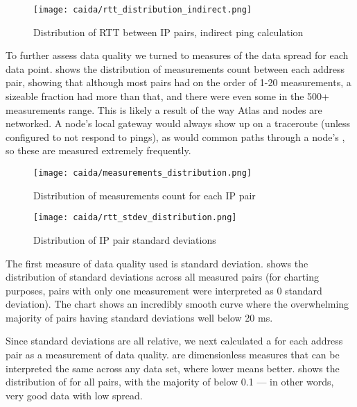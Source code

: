 \begin{figure}[h]
    \centering
    \texttt{[image: caida/rtt\_distribution\_indirect.png]}
    \caption{Distribution of RTT between IP pairs, indirect ping calculation}
    \label{fig:caida_rtt_distribution_indirect}
\end{figure}

To further assess data quality we turned to measures of the data spread for each data point.  shows the distribution of measurements count between each \ip address pair, showing that although most pairs had on the order of 1-20 measurements, a sizeable fraction had more than that, and there were even some in the 500+ measurements range. This is likely a result of the way \ripe Atlas and \caida nodes are networked. A node's local gateway would always show up on a traceroute (unless configured to not respond to pings), as would common paths through a node's \isp, so these \ips are measured extremely frequently.

\begin{figure}[h]
    \centering
    \texttt{[image: caida/measurements\_distribution.png]}
    \caption{Distribution of measurements count for each IP pair}
    \label{fig:caida_measurements_distribution}
\end{figure}

\begin{figure}[H]
    \centering
    \texttt{[image: caida/rtt\_stdev\_distribution.png]}
    \caption{Distribution of IP pair standard deviations}
    \label{fig:caida_stdev_distribution}
\end{figure}

The first measure of data quality used is standard deviation.  shows the distribution of standard deviations across all measured \ip pairs (for charting purposes, pairs with only one measurement were interpreted as 0 standard deviation). The chart shows an incredibly smooth curve where the overwhelming majority of pairs having standard deviations well below 20 ms.

Since standard deviations are all relative, we next calculated a \cv for each \ip address pair as a measurement of data quality. \CVs are dimensionless measures that can be interpreted the same across any data set, where lower means better.  shows the distribution of \cvs for all \ip pairs, with the majority of \cvs below 0.1 --- in other words, very good data with low spread.

